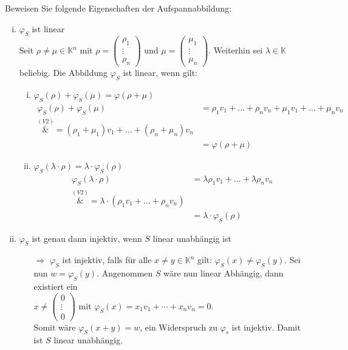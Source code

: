 \documentclass{article}
\begin{document}
Beweisen Sie folgende Eigenschaften der Aufspannabbildung:
\begin{enumerate}[(i)]
\item $\varphi_S$ ist linear \\
  Seit $\rho \ne \mu \in \mathbb{K}^n$ mit $\rho = \begin{pmatrix}\rho_1 \\ \vdots \\ \rho_n \end{pmatrix}$
  und $\mu = \begin{pmatrix}\mu_1 \\ \vdots \\ \mu_n \end{pmatrix}$.
  Weiterhin sei $\lambda \in \mathbb{K}$ beliebig.
  Die Abbildung $\varphi_S$ ist linear, wenn gilt:
  \begin{enumerate}[(i)]
  \item $\varphi_S(\rho) + \varphi_S(\mu) = \varphi(\rho + \mu)$
    \begin{align*}
      \varphi_S(\rho) + \varphi_S(\mu) &= \rho_1 v_1 + \ldots + \rho_n v_n + \mu_1 v_1 + \ldots + \mu_n v_n \\
      \overset{(V2)}&= \left(\rho_1 + \mu_1\right) v_1 + \ldots + (\rho_n + \mu_n) v_n \\
                                       &= \varphi(\rho + \mu)
    \end{align*}
  \item $\varphi_S(\lambda \cdot \rho) = \lambda \cdot \varphi_S(\rho)$
    \begin{align*}
      \varphi_S(\lambda \cdot \rho) &= \lambda \rho_1 v_1 + \ldots + \lambda \rho_n v_n \\
      \overset{(V2)}&= \lambda \cdot (\rho_1 v_1 + \ldots + \rho_n v_n) \\
                                    &= \lambda \cdot \varphi_S (\rho)
    \end{align*}
  \end{enumerate}
  
\item $\varphi_S$ ist genau dann injektiv, wenn $S$ linear unabhängig ist
  \begin{itemize}
  \item[$\Rightarrow$] $\varphi_S$ ist injektiv, falls für alle $x \ne y \in \mathbb{K}^n$ gilt:
    $\varphi_S(x) \ne \varphi_S(y)$.
    Sei nun $w = \varphi_S(y)$. Angenommen $S$ wäre nun linear Abhängig, dann existiert ein \\
    $x \ne \begin{pmatrix} 0 \\ \vdots \\ 0 \end{pmatrix}$ mit
    $\varphi_S(x) = x_1 v_1 + \cdots + x_n v_n = 0$. \\
    Somit wäre $\varphi_S(x + y) = w$, ein Widerspruch zu $\varphi_s$ ist injektiv. Damit ist
    $S$ linear unabhängig.


\end{itemize}
\end{enumerate}
\end{document}
